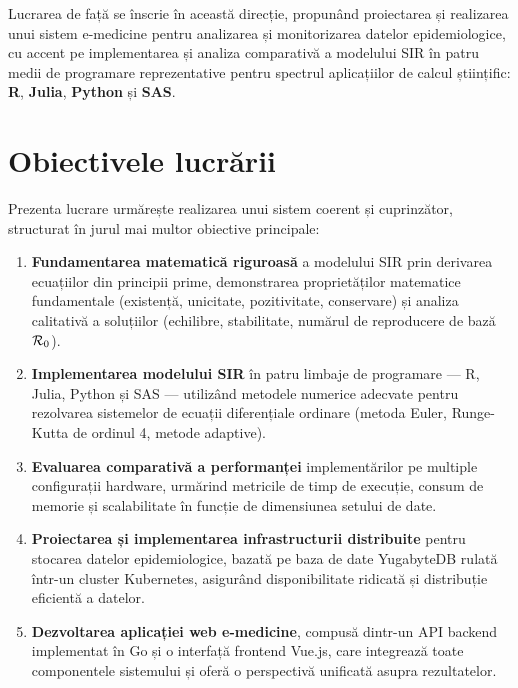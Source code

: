 Lucrarea de față se înscrie în această direcție, propunând proiectarea și
realizarea unui sistem e-medicine pentru analizarea și monitorizarea datelor
epidemiologice, cu accent pe implementarea și analiza comparativă a modelului
SIR în patru medii de programare reprezentative pentru spectrul aplicațiilor
de calcul științific: \textbf{R}, \textbf{Julia}, \textbf{Python} și \textbf{SAS}.

\section{Obiectivele lucrării}
\label{sec:obiective}

Prezenta lucrare urmărește realizarea unui sistem coerent și cuprinzător, structurat
în jurul mai multor obiective principale:

\begin{enumerate}
    \item \textbf{Fundamentarea matematică riguroasă} a modelului SIR prin derivarea
    ecuațiilor din principii prime, demonstrarea proprietăților matematice fundamentale
    (existență, unicitate, pozitivitate, conservare) și analiza calitativă a
    soluțiilor (echilibre, stabilitate, numărul de reproducere de bază $\mathcal{R}_0$).

    \item \textbf{Implementarea modelului SIR} în patru limbaje de programare ---
    R, Julia, Python și SAS --- utilizând metodele numerice adecvate pentru rezolvarea
    sistemelor de ecuații diferențiale ordinare (metoda Euler, Runge-Kutta de ordinul 4,
    metode adaptive).

    \item \textbf{Evaluarea comparativă a performanței} implementărilor pe multiple
    configurații hardware, urmărind metricile de timp de execuție, consum de memorie
    și scalabilitate în funcție de dimensiunea setului de date.

    \item \textbf{Proiectarea și implementarea infrastructurii distribuite} pentru
    stocarea datelor epidemiologice, bazată pe baza de date YugabyteDB rulată
    într-un cluster Kubernetes, asigurând disponibilitate ridicată și distribuție
    eficientă a datelor.

    \item \textbf{Dezvoltarea aplicației web e-medicine}, compusă dintr-un API
    backend implementat în Go și o interfață frontend Vue.js, care integrează
    toate componentele sistemului și oferă o perspectivă unificată asupra
    rezultatelor.
\end{enumerate}

